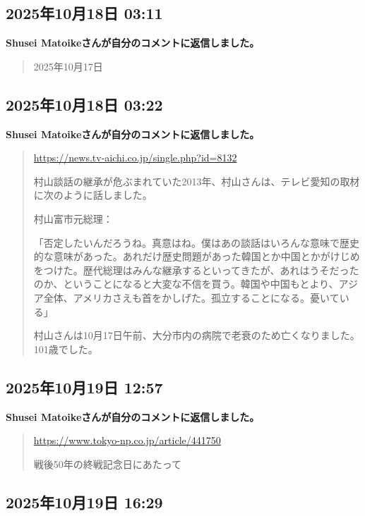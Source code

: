 \subsection*{2025年10月18日 03:11}

\textbf{Shusei Matoikeさんが自分のコメントに返信しました。}

\begin{quote}
2025年10月17日
\end{quote}

\subsection*{2025年10月18日 03:22}

\textbf{Shusei Matoikeさんが自分のコメントに返信しました。}

\begin{quote}
\url{https://news.tv-aichi.co.jp/single.php?id=8132}

村山談話の継承が危ぶまれていた2013年、村山さんは、テレビ愛知の取材に次のように話しました。

村山富市元総理：

「否定したいんだろうね。真意はね。僕はあの談話はいろんな意味で歴史的な意味があった。あれだけ歴史問題があった韓国とか中国とかがけじめをつけた。歴代総理はみんな継承するといってきたが、あれはうそだったのか、ということになると大変な不信を買う。韓国や中国もとより、アジア全体、アメリカさえも首をかしげた。孤立することになる。憂いている」

村山さんは10月17日午前、大分市内の病院で老衰のため亡くなりました。101歳でした。
\end{quote}

\subsection*{2025年10月19日 12:57}

\textbf{Shusei Matoikeさんが自分のコメントに返信しました。}

\begin{quote}
\url{https://www.tokyo-np.co.jp/article/441750}

戦後50年の終戦記念日にあたって
\end{quote}

\subsection*{2025年10月19日 16:29}

